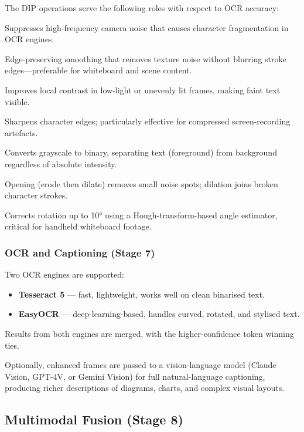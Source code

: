\documentclass[12pt,a4paper]{article}
\begin{document}
The DIP operations serve the following roles with respect to OCR accuracy:
\begin{description}[leftmargin=1.5cm]
  \item[Gaussian denoising.] Suppresses high-frequency camera noise that causes
    character fragmentation in OCR engines.
  \item[Bilateral filtering.] Edge-preserving smoothing that removes texture noise
    without blurring stroke edges—preferable for whiteboard and scene content.
  \item[CLAHE (Contrast-Limited Adaptive Histogram Equalisation).] Improves local
    contrast in low-light or unevenly lit frames, making faint text visible.
  \item[Unsharp masking.] Sharpens character edges; particularly effective for
    compressed screen-recording artefacts.
  \item[Otsu and adaptive thresholding.] Converts grayscale to binary, separating
    text (foreground) from background regardless of absolute intensity.
  \item[Morphological operations.] Opening (erode then dilate) removes small noise
    spots; dilation joins broken character strokes.
  \item[Deskewing.] Corrects rotation up to 10° using a Hough-transform-based angle
    estimator, critical for handheld whiteboard footage.
\end{description}

\subsubsection{OCR and Captioning (Stage 7)}
Two OCR engines are supported:
\begin{itemize}[leftmargin=*]
  \item \textbf{Tesseract 5} \cite{tesseract2007} — fast, lightweight, works well on
    clean binarised text.
  \item \textbf{EasyOCR} \cite{easyocr} — deep-learning-based, handles curved,
    rotated, and stylised text.
\end{itemize}
Results from both engines are merged, with the higher-confidence token winning ties.

Optionally, enhanced frames are passed to a vision-language model (Claude Vision,
GPT-4V, or Gemini Vision) for full natural-language captioning, producing richer
descriptions of diagrams, charts, and complex visual layouts.

\subsection{Multimodal Fusion (Stage 8)}
\label{subsec:fusion}
\end{document}
